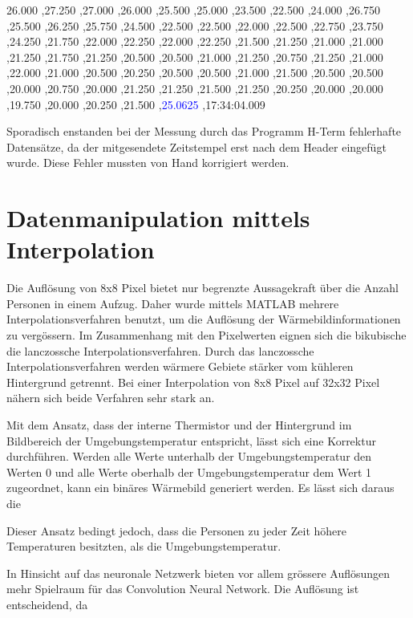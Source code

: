 26.000 ,27.250 ,27.000 ,26.000 ,25.500 ,25.000 ,23.500 ,22.500 ,24.000 ,26.750 ,25.500 ,26.250 ,25.750 ,24.500 ,22.500 ,22.500 ,22.000 ,22.500 ,22.750 ,23.750 ,24.250 ,21.750 ,22.000 ,22.250 ,22.000 ,22.250 ,21.500 ,21.250 ,21.000 ,21.000 ,21.250 ,21.750 ,21.250 ,20.500 ,20.500 ,21.000 ,21.250 ,20.750 ,21.250 ,21.000 ,22.000 ,21.000 ,20.500 ,20.250 ,20.500 ,20.500 ,21.000 ,21.500 ,20.500 ,20.500 ,20.000 ,20.750 ,20.000 ,21.250 ,21.250 ,21.500 ,21.250 ,20.250 ,20.000 ,20.000 ,19.750 ,20.000 ,20.250 ,21.500 ,\textcolor{blue}{25.0625} ,17:34:04.009

Sporadisch enstanden bei der Messung durch das Programm H-Term fehlerhafte Datensätze, da der mitgesendete Zeitstempel erst nach dem Header eingefügt wurde. Diese Fehler mussten von Hand korrigiert werden. 




\section{Datenmanipulation mittels Interpolation}

Die Auflösung von 8x8 Pixel bietet nur begrenzte Aussagekraft über die Anzahl Personen in einem Aufzug. Daher wurde mittels MATLAB mehrere Interpolationsverfahren benutzt, um die Auflösung der Wärmebildinformationen zu vergössern. Im Zusammenhang mit den Pixelwerten eignen sich die bikubische die lanczossche Interpolationsverfahren. Durch das lanczossche Interpolationsverfahren werden wärmere Gebiete stärker vom kühleren Hintergrund getrennt. Bei einer Interpolation von 8x8 Pixel auf 32x32 Pixel nähern sich beide Verfahren sehr stark an. 

Mit dem Ansatz, dass der interne Thermistor und der Hintergrund im Bildbereich der Umgebungstemperatur entspricht, lässt sich eine Korrektur durchführen. Werden alle Werte unterhalb der Umgebungstemperatur den Werten 0 und alle Werte oberhalb der Umgebungstemperatur dem Wert 1 zugeordnet, kann ein binäres Wärmebild generiert werden. Es lässt sich daraus die 

Dieser Ansatz bedingt jedoch, dass die Personen zu jeder Zeit höhere Temperaturen besitzten, als die Umgebungstemperatur.

In Hinsicht auf das neuronale Netzwerk bieten vor allem grössere Auflösungen mehr Spielraum für das Convolution Neural Network. Die Auflösung ist entscheidend, da 



